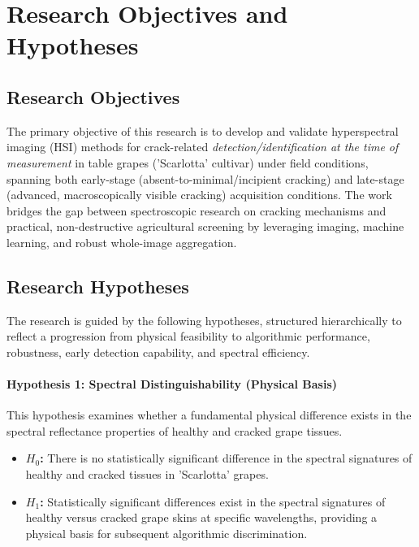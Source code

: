 \chapter{Research Objectives and Hypotheses}

\section{Research Objectives}

\noindent
The primary objective of this research is to develop and validate hyperspectral imaging (HSI) methods for crack-related \textit{detection/identification at the time of measurement} in table grapes ('Scarlotta' cultivar) under field conditions, spanning both early-stage (absent-to-minimal/incipient cracking) and late-stage (advanced, macroscopically visible cracking) acquisition conditions. The work bridges the gap between spectroscopic research on cracking mechanisms and practical, non-destructive agricultural screening by leveraging imaging, machine learning, and robust whole-image aggregation.


\section{Research Hypotheses}

\noindent
The research is guided by the following hypotheses, structured hierarchically to reflect a progression from physical feasibility to algorithmic performance, robustness, early detection capability, and spectral efficiency.

\subsubsection{Hypothesis 1: Spectral Distinguishability (Physical Basis)}
\label{hyp:spectral_distinguishability}

\noindent
This hypothesis examines whether a fundamental physical difference exists in the spectral reflectance properties of healthy and cracked grape tissues.

\begin{itemize}
    \item \textbf{$H_0$:} There is no statistically significant difference in the spectral signatures of healthy and cracked tissues in 'Scarlotta' grapes.
    \item \textbf{$H_1$:} Statistically significant differences exist in the spectral signatures of healthy versus cracked grape skins at specific wavelengths, providing a physical basis for subsequent algorithmic discrimination.
\end{itemize}


